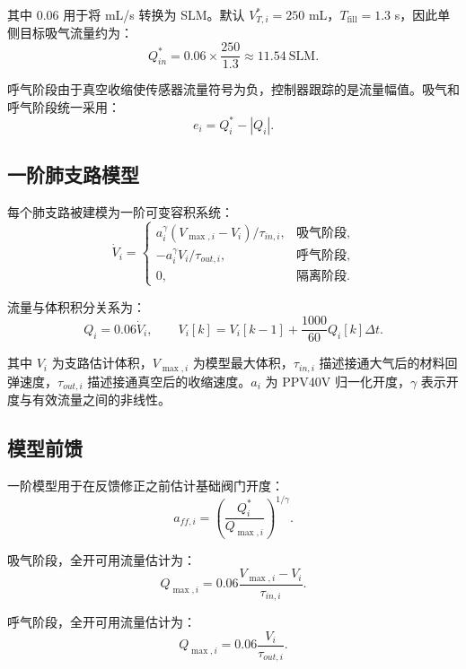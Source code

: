 \documentclass[UTF8,11pt,a4paper]{ctexart}
\begin{document}
其中 0.06 用于将 mL/s 转换为 SLM。默认 $V^*_{T,i}=250$ mL，$T_{\mathrm{fill}}=1.3$ s，因此单侧目标吸气流量约为：
\begin{equation}
  Q^*_{in}=0.06\times\frac{250}{1.3}\approx11.54~\mathrm{SLM}.
\end{equation}

呼气阶段由于真空收缩使传感器流量符号为负，控制器跟踪的是流量幅值。吸气和呼气阶段统一采用：
\begin{equation}
  e_i=Q^*_i-|Q_i|.
\end{equation}

\subsection{一阶肺支路模型}

每个肺支路被建模为一阶可变容积系统：
\begin{equation}
\dot V_i =
\begin{cases}
a_i^\gamma (V_{\max,i}-V_i)/\tau_{in,i}, & \text{吸气阶段},\\
-a_i^\gamma V_i/\tau_{out,i}, & \text{呼气阶段},\\
0, & \text{隔离阶段}.
\end{cases}
\end{equation}

流量与体积积分关系为：
\begin{equation}
  Q_i=0.06\dot V_i,
  \qquad
  V_i[k]=V_i[k-1]+\frac{1000}{60}Q_i[k]\Delta t.
\end{equation}

其中 $V_i$ 为支路估计体积，$V_{\max,i}$ 为模型最大体积，$\tau_{in,i}$ 描述接通大气后的材料回弹速度，$\tau_{out,i}$ 描述接通真空后的收缩速度。$a_i$ 为 PPV40V 归一化开度，$\gamma$ 表示开度与有效流量之间的非线性。

\subsection{模型前馈}

一阶模型用于在反馈修正之前估计基础阀门开度：
\begin{equation}
  a_{ff,i} =
  \left(
    \frac{Q^*_i}{Q_{\max,i}}
  \right)^{1/\gamma}.
\end{equation}

吸气阶段，全开可用流量估计为：
\begin{equation}
  Q_{\max,i}=0.06\frac{V_{\max,i}-V_i}{\tau_{in,i}}.
\end{equation}

呼气阶段，全开可用流量估计为：
\begin{equation}
  Q_{\max,i}=0.06\frac{V_i}{\tau_{out,i}}.
\end{equation}
\end{document}
